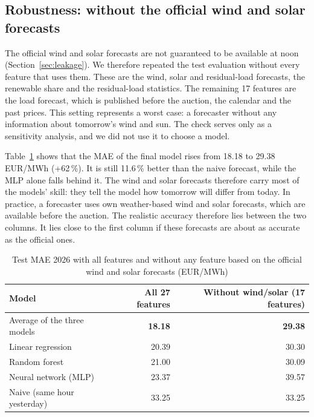 \documentclass[12pt,oneside]{article}
\begin{document}
\subsection{Robustness: without the official wind and solar forecasts} \label{sec:robust}

The official wind and solar forecasts are not guaranteed to be available at noon (Section~\ref{sec:leakage}). We therefore repeated the test evaluation without every feature that uses them. These are the wind, solar and residual-load forecasts, the renewable share and the residual-load statistics. The remaining 17 features are the load forecast, which is published before the auction, the calendar and the past prices. This setting represents a worst case: a forecaster without any information about tomorrow's wind and sun. The check serves only as a sensitivity analysis, and we did not use it to choose a model.

Table~\ref{tab:robust} shows that the MAE of the final model rises from 18.18 to 29.38\,EUR/MWh (+62\,\%). It is still 11.6\,\% better than the naive forecast, while the MLP alone falls behind it. The wind and solar forecasts therefore carry most of the models' skill: they tell the model how tomorrow will differ from today. In practice, a forecaster uses own weather-based wind and solar forecasts, which are available before the auction. The realistic accuracy therefore lies between the two columns. It lies close to the first column if these forecasts are about as accurate as the official ones.

\begin{table}[!htbp]
    \centering
    \caption{Test MAE 2026 with all features and without any feature based on the official wind and solar forecasts (EUR/MWh)}
    \begin{tabular}{lrr}
        \toprule
        Model & All 27 features & Without wind/solar (17 features) \\
        \midrule
        Average of the three models & \textbf{18.18} & \textbf{29.38} \\
        Linear regression & 20.39 & 30.30 \\
        Random forest & 21.00 & 30.09 \\
        Neural network (MLP) & 23.37 & 39.57 \\
        Naive (same hour yesterday) & 33.25 & 33.25 \\
        \bottomrule
    \end{tabular}
    \label{tab:robust}
\end{table}
\end{document}
